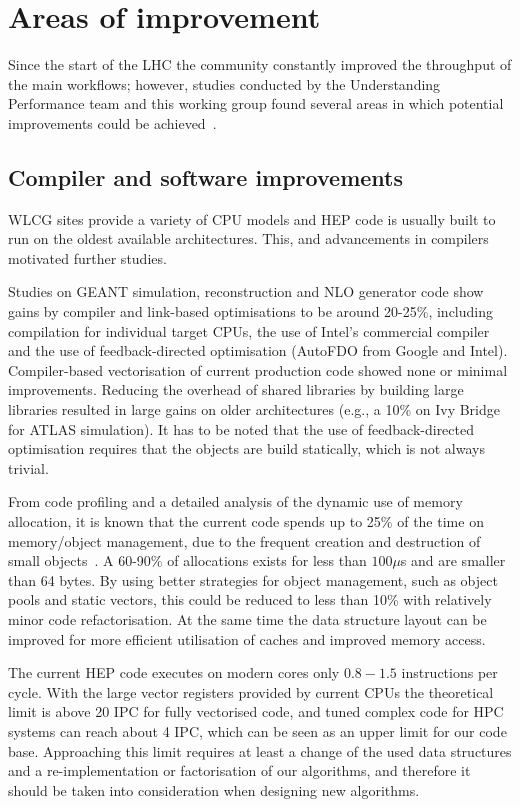 \section{Areas of improvement}
Since the start of the LHC the community constantly improved the
throughput of the main workflows; however, studies conducted by the
Understanding Performance team and this working group found several
areas in which potential improvements could be
achieved~\cite{improvements}.

\subsection{Compiler and software improvements}
WLCG sites provide a variety of CPU models and HEP code is usually
built to run on the oldest available architectures. This, and
advancements in compilers motivated further studies.

Studies on GEANT simulation, reconstruction and NLO generator code
show gains by compiler and link-based optimisations to be around
20-25\%, including compilation for individual target CPUs, the use of
Intel’s commercial compiler and the use of feedback-directed
optimisation (AutoFDO from Google and Intel). Compiler-based
vectorisation of current production code showed none or minimal
improvements. Reducing the overhead of shared libraries by building
large libraries resulted in large gains on older architectures (e.g.,
a 10\% on Ivy Bridge for ATLAS simulation). It has to be noted that
the use of feedback-directed optimisation requires that the objects
are build statically, which is not always trivial.

From code profiling and a detailed analysis of the dynamic use of
memory allocation, it is known that the current code spends up to 25\%
of the time on memory/object management, due to the frequent creation
and destruction of small objects~\cite{fomtools}. A 60-90\% of
allocations exists for less than $100\mu$s and are smaller than 64
bytes.  By using better strategies for object management, such as
object pools and static vectors, this could be reduced to less than
10\% with relatively minor code refactorisation. At the same time the
data structure layout can be improved for more efficient utilisation
of caches and improved memory access.

The current HEP code executes on modern cores only $0.8-1.5$
instructions per cycle. With the large vector registers provided by
current CPUs the theoretical limit is above 20 IPC for fully
vectorised code, and tuned complex code for HPC systems can reach
about 4 IPC, which can be seen as an upper limit for our code
base. Approaching this limit requires at least a change of the used
data structures and a re-implementation or factorisation of our
algorithms, and therefore it should be taken into consideration when
designing new algorithms.

